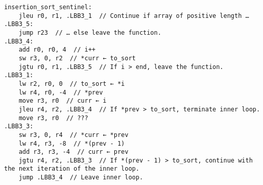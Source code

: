 \begin{verbatim}
insertion_sort_sentinel:
    jleu r0, r1, .LBB3_1  // Continue if array of positive length …
.LBB3_5:
    jump r23  // … else leave the function.
.LBB3_4:
    add r0, r0, 4  // i++
    sw r3, 0, r2  // *curr ← to_sort
    jgtu r0, r1, .LBB3_5  // If i > end, leave the function.
.LBB3_1:
    lw r2, r0, 0  // to_sort ← *i
    lw r4, r0, -4  // *prev
    move r3, r0  // curr ← i
    jleu r4, r2, .LBB3_4  // If *prev > to_sort, terminate inner loop.
    move r3, r0  // ???
.LBB3_3:
    sw r3, 0, r4  // *curr ← *prev
    lw r4, r3, -8  // *(prev - 1)
    add r3, r3, -4  // curr ← prev
    jgtu r4, r2, .LBB3_3  // If *(prev - 1) > to_sort, continue with the next iteration of the inner loop.
    jump .LBB3_4  // Leave inner loop.
\end{verbatim}